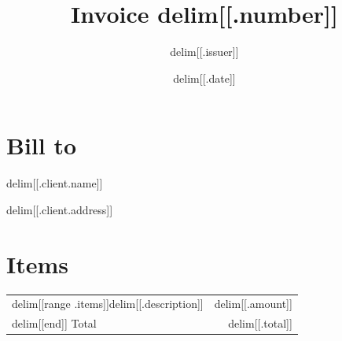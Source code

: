 \documentclass{article}
\title{Invoice delim[[.number]]}
\author{delim[[.issuer]]}
\date{delim[[.date]]}
\begin{document}
\maketitle

\section*{Bill to}
delim[[.client.name]]\par
delim[[.client.address]]

\section*{Items}
\begin{tabular}{lr}
delim[[range .items]]delim[[.description]] & delim[[.amount]] \\
delim[[end]]\hline
Total & delim[[.total]] \\
\end{tabular}
\end{document}
